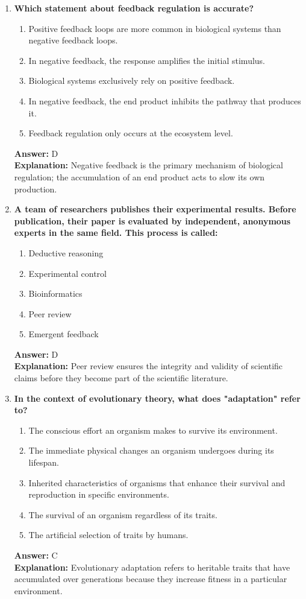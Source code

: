 \documentclass[11pt, a4paper]{article}
\begin{document}
\begin{enumerate}
\item \textbf{Which statement about feedback regulation is accurate?}
\begin{enumerate}[label=\Alph*.]
    \item Positive feedback loops are more common in biological systems than negative feedback loops.
    \item In negative feedback, the response amplifies the initial stimulus.
    \item Biological systems exclusively rely on positive feedback.
    \item In negative feedback, the end product inhibits the pathway that produces it.
    \item Feedback regulation only occurs at the ecosystem level.
\end{enumerate}
\textbf{Answer:} D \\
\textbf{Explanation:} Negative feedback is the primary mechanism of biological regulation; the accumulation of an end product acts to slow its own production.

\item \textbf{A team of researchers publishes their experimental results. Before publication, their paper is evaluated by independent, anonymous experts in the same field. This process is called:}
\begin{enumerate}[label=\Alph*.]
    \item Deductive reasoning
    \item Experimental control
    \item Bioinformatics
    \item Peer review
    \item Emergent feedback
\end{enumerate}
\textbf{Answer:} D \\
\textbf{Explanation:} Peer review ensures the integrity and validity of scientific claims before they become part of the scientific literature.

\item \textbf{In the context of evolutionary theory, what does "adaptation" refer to?}
\begin{enumerate}[label=\Alph*.]
    \item The conscious effort an organism makes to survive its environment.
    \item The immediate physical changes an organism undergoes during its lifespan.
    \item Inherited characteristics of organisms that enhance their survival and reproduction in specific environments.
    \item The survival of an organism regardless of its traits.
    \item The artificial selection of traits by humans.
\end{enumerate}
\textbf{Answer:} C \\
\textbf{Explanation:} Evolutionary adaptation refers to heritable traits that have accumulated over generations because they increase fitness in a particular environment.

\end{enumerate}
\end{document}
